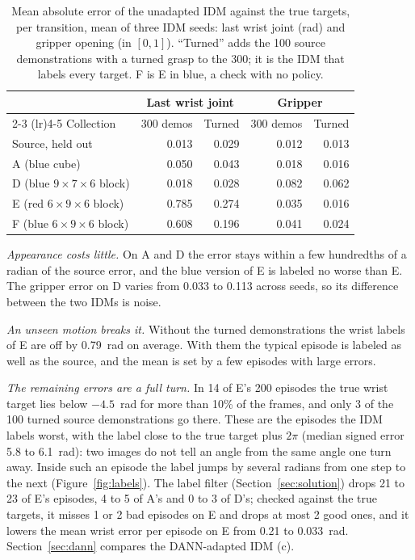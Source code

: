 \documentclass{article}
\begin{document}
\begin{table}[t]
  \caption{Mean absolute error of the unadapted IDM against the true
  targets, per transition, mean of three IDM seeds: last wrist joint (rad) and gripper
  opening (in $[0, 1]$). ``Turned'' adds the 100 source demonstrations with a turned
  grasp to the 300; it is the IDM that labels every target. F is E in blue, a check with
  no policy.}
  \label{tab:idm}
  \centering
  \small
  \begin{tabular}{@{}lrrrr@{}}
    \toprule
    & \multicolumn{2}{c}{Last wrist joint} & \multicolumn{2}{c}{Gripper} \\
    \cmidrule(lr){2-3} \cmidrule(lr){4-5}
    Collection & 300 demos & Turned & 300 demos & Turned \\
    \midrule
    Source, held out & 0.013 & 0.029 & 0.012 & 0.013 \\
    A (blue cube) & 0.050 & 0.043 & 0.018 & 0.016 \\
    D (blue $9 \times 7 \times 6$ block) & 0.018 & 0.028 & 0.082 & 0.062 \\
    E (red $6 \times 9 \times 6$ block) & 0.785 & 0.274 & 0.035 & 0.016 \\
    F (blue $6 \times 9 \times 6$ block) & 0.608 & 0.196 & 0.041 & 0.024 \\
    \bottomrule
  \end{tabular}
\end{table}

\emph{Appearance costs little.} On A and D the error stays within a few hundredths of a
radian of the source error, and the blue version of E is labeled no worse than E. The
gripper error on D varies from 0.033 to 0.113 across seeds, so its difference between the
two IDMs is noise.

\emph{An unseen motion breaks it.} Without the turned demonstrations the wrist labels of E
are off by 0.79~rad on average. With them the typical episode is labeled as well as
the source, and the mean is set by a few episodes with large errors.

\emph{The remaining errors are a full turn.} In 14 of E's 200 episodes the true wrist
target lies below $-4.5$~rad for more than 10\% of the frames, and only 3 of the 100
turned source demonstrations go there. These are the episodes the IDM labels worst, with
the label close to the true target plus $2\pi$ (median signed error 5.8 to 6.1~rad): two
images do not tell an angle from the same angle one turn away. Inside such an episode
the label jumps by several radians from one step to the next (Figure~\ref{fig:labels}).
The label filter (Section~\ref{sec:solution}) drops 21 to 23 of E's episodes, 4 to 5 of
A's and 0 to 3 of D's; checked against the true targets, it misses 1 or 2 bad episodes on
E and drops at most 2 good ones, and it lowers the mean wrist error per episode on E from
0.21 to 0.033~rad. Section~\ref{sec:dann} compares the DANN-adapted IDM (c).
\end{document}
